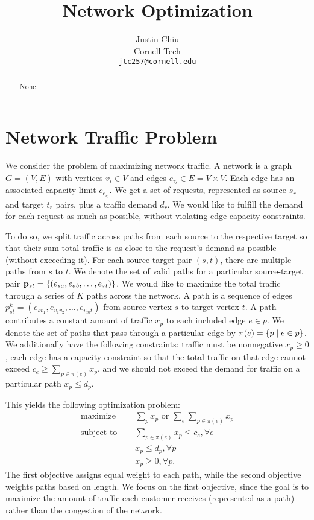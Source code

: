 \documentclass[11pt]{article}
\title{Network Optimization}
\author{Justin Chiu \\
  Cornell Tech \\
  \texttt{jtc257@cornell.edu}}
\begin{document}
\maketitle
\begin{abstract}
None
\end{abstract}

\section{Network Traffic Problem}
We consider the problem of maximizing network traffic.
A network is a graph $G = (V,E)$ with vertices $v_i\in V$ and edges
$e_{ij}\in E = V\times V$.
Each edge has an associated capacity limit $c_{e_{ij}}$.
We get a set of requests, represented as source $s_r$ and target $t_r$ pairs,
plus a traffic demand $d_r$.
We would like to fulfill the demand for each request as much as possible,
without violating edge capacity constraints.

To do so, we split traffic across paths from each source to the respective
target so that their sum total traffic is as close to the request's demand
as possible (without exceeding it).
For each source-target pair $(s,t)$, there are multiple paths from $s$ to $t$.
We denote the set of valid paths for a particular source-target pair
$\mathbf{p}_{st} = \left\{(e_{sa}, e_{ab}, \ldots, e_{zt})\right\}$.
We would like to maximize the total traffic through a series of $K$ paths across the network.
A path is a sequence of edges $p_{st}^k = (e_{sv_1},e_{v_1v_2},\ldots,e_{v_mt})$
from source vertex $s$ to target vertex $t$.
A path contributes a constant amount of traffic $x_p$ to each included edge $e\in p$.
We denote the set of paths that pass through a particular edge by
$\pi(e) = \left\{p \mid e \in p\right\}$.
We additionally have the following constraints: traffic must be nonnegative $x_p \geq 0$,
each edge has a capacity constraint so that the total traffic on that
edge cannot exceed $ c_e \ge \sum_{p\in\pi(e)} x_p $,
and we should not exceed the demand for traffic on a particular path $x_p \leq d_p$.

This yields the following optimization problem:
\begin{equation}
\label{eqn:network-opt}
\begin{aligned}
\textrm{maximize } \quad & \sum_{p} x_p \textrm{ or } \sum_{e} \sum_{p\in\pi(e)}x_{p}\\
\textrm{subject to } \quad &\sum_{p\in\pi(e)}x_p \le c_e, \forall e\\
&x_p \le d_p, \forall p\\
& x_p \geq 0, \forall p.
\end{aligned}
\end{equation}
The first objective assigns equal weight to each path, while the second
objective weights paths based on length.
We focus on the first objective, since the goal is to maximize the amount of traffic
each customer receives (represented as a path) rather than the congestion
of the network.
\end{document}
